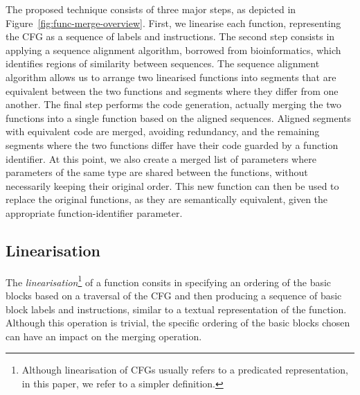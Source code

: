 The proposed technique consists of three major steps, as depicted in
Figure~\ref{fig:func-merge-overview}.
First, we linearise each function, representing the CFG as a sequence of 
labels and instructions.
The second step consists in applying a sequence alignment algorithm, borrowed
from bioinformatics, which identifies regions of similarity between sequences.
The sequence alignment algorithm allows us to arrange two linearised functions
into segments that are equivalent between the two functions and segments where
they differ from one another.
The final step performs the code generation, actually merging the two functions
into a single function based on the aligned sequences.
Aligned segments with equivalent code are merged, avoiding redundancy, %
and the remaining segments where the two functions differ have their code
guarded by a function identifier.
At this point, we also create a merged list of parameters where parameters of
the same type are shared between the functions, without necessarily keeping
their original order.
This new function can then be used to replace the original functions, as they
are semantically equivalent, given the appropriate function-identifier
parameter.

\subsection{Linearisation}

The \textit{linearisation}\footnote{Although linearisation of CFGs
usually refers to a predicated representation, %
in this paper, we refer to a simpler definition.}
of a function consits in specifying an ordering of the basic blocks based on a
traversal of the CFG and then producing a sequence of basic block labels and
instructions, similar to a textual representation of the function.
Although this operation is trivial, the specific ordering of the basic blocks
chosen can have an impact on the merging operation.


